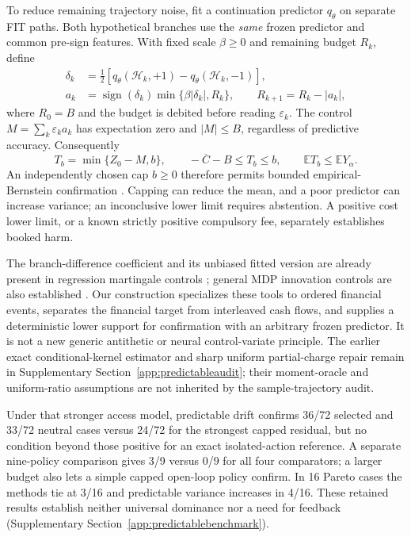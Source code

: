 To reduce remaining trajectory noise, fit a continuation predictor $q_\theta$ on separate FIT paths. Both hypothetical branches use the \emph{same} frozen predictor and common pre-sign features. With fixed scale $\beta\ge0$ and remaining budget $R_k$, define
\[
\begin{aligned}
\delta_k&=\tfrac12[q_\theta(\mathcal H_k,+1)-q_\theta(\mathcal H_k,-1)],\\
a_k&=\operatorname{sign}(\delta_k)\min\{\beta|\delta_k|,R_k\},
\qquad R_{k+1}=R_k-|a_k|,
\end{aligned}
\]
where $R_0=B$ and the budget is debited before reading $\varepsilon_k$. The control $M=\sum_k\varepsilon_k a_k$ has expectation zero and $|M|\le B$, regardless of predictive accuracy. Consequently
\[
T_b=\min\{Z_0-M,b\},\qquad
-\overline C-B\le T_b\le b,
\qquad \mathbb ET_b\le\mathbb EY_\alpha.
\]
An independently chosen cap $b\ge0$ therefore permits bounded empirical-Bernstein confirmation \cite{maurer2009empirical}. Capping can reduce the mean, and a poor predictor can increase variance; an inconclusive lower limit requires abstention. A positive cost lower limit, or a known strictly positive compulsory fee, separately establishes booked harm.

The branch-difference coefficient and its unbiased fitted version are already present in regression martingale controls \cite{belomestny2018regression}; general MDP innovation controls are also established \cite{belomestny2024primaldual}. Our construction specializes these tools to ordered financial events, separates the financial target from interleaved cash flows, and supplies a deterministic lower support for confirmation with an arbitrary frozen predictor. It is not a new generic antithetic or neural control-variate principle. The earlier exact conditional-kernel estimator and sharp uniform partial-charge repair remain in Supplementary Section~\ref{app:predictableaudit}; their moment-oracle and uniform-ratio assumptions are not inherited by the sample-trajectory audit.

Under that stronger access model, predictable drift confirms 36/72 selected and 33/72 neutral cases versus 24/72 for the strongest capped residual, but no condition beyond those positive for an exact isolated-action reference. A separate nine-policy comparison gives 3/9 versus 0/9 for all four comparators; a larger budget also lets a simple capped open-loop policy confirm. In 16 Pareto cases the methods tie at 3/16 and predictable variance increases in 4/16. These retained results establish neither universal dominance nor a need for feedback (Supplementary Section~\ref{app:predictablebenchmark}).

